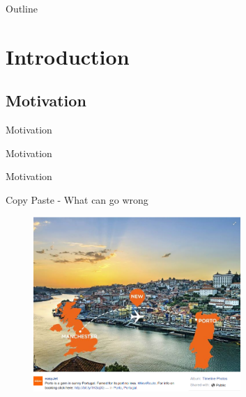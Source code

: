 \documentclass[xcolor=dvipsnames]{beamer}
\begin{document}
\begin{frame}{Outline}
  \tableofcontents[] %
\end{frame}

\section{Introduction}
\subsection{Motivation}
\begin{frame}{Motivation}
\mycode
\end{frame}
\begin{frame}{Motivation}
\mycodeE
\end{frame}
\begin{frame}{Motivation}
\mycodeEx
\end{frame}
\begin{frame}{Copy Paste - What can go wrong}
\begin{figure}[htbp]
  \centering
  \includegraphics[width=0.7\textwidth]{img/WhatCanGoWrongWithCopyPaste1.png}
  \label{fig:CopyPaste}
\end{figure}
\end{frame}
\end{document}
